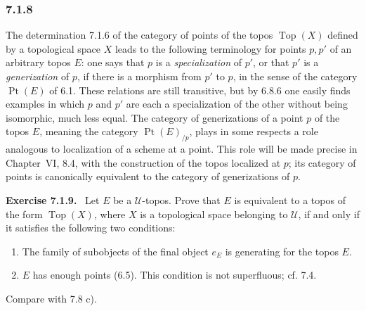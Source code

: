 \documentclass[11pt]{article}
\newcommand{\U}{\mathcal{U}}
\newcommand{\Top}{\operatorname{Top}}
\newcommand{\Ppoint}{\operatorname{Pt}}
\newenvironment{remarktext}[1]{\par\medskip\noindent\textbf{#1.}\ }{\par\medskip}
\begin{document}
\subsubsection*{7.1.8}
The determination 7.1.6 of the category of points of the topos \(\Top(X)\) defined by a topological space \(X\) leads to the following terminology for points \(p,p'\) of an arbitrary topos \(E\): one says that \(p\) is a \emph{specialization} of \(p'\), or that \(p'\) is a \emph{generization} of \(p\), if there is a morphism from \(p'\) to \(p\), in the sense of the category \(\Ppoint(E)\) of 6.1. These relations are still transitive, but by 6.8.6 one easily finds examples in which \(p\) and \(p'\) are each a specialization of the other without being isomorphic, much less equal. The category of generizations of a point \(p\) of the topos \(E\), meaning the category \(\Ppoint(E)_{/p}\), plays in some respects a role analogous to localization of a scheme at a point. This role will be made precise in Chapter~VI, 8.4, with the construction of the topos localized at \(p\); its category of points is canonically equivalent to the category of generizations of \(p\).

\begin{remarktext}{Exercise 7.1.9}
Let \(E\) be a \(\U\)-topos. Prove that \(E\) is equivalent to a topos of the form \(\Top(X)\), where \(X\) is a topological space belonging to \(\U\), if and only if it satisfies the following two conditions:
\begin{enumerate}[label=\alph*)]
\item The family of subobjects of the final object \(e_E\) is generating for the topos \(E\).
\item \(E\) has enough points (6.5). This condition is not superfluous; cf. 7.4.
\end{enumerate}
Compare with 7.8 c).
\end{remarktext}
\end{document}

